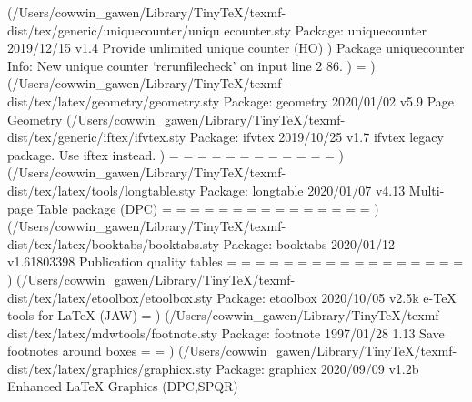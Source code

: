 (/Users/cowwin_gawen/Library/TinyTeX/texmf-dist/tex/generic/uniquecounter/uniqu
ecounter.sty
Package: uniquecounter 2019/12/15 v1.4 Provide unlimited unique counter (HO)
)
Package uniquecounter Info: New unique counter `rerunfilecheck' on input line 2
86.
)
\Hy@SectionHShift=
)
(/Users/cowwin_gawen/Library/TinyTeX/texmf-dist/tex/latex/geometry/geometry.sty
Package: geometry 2020/01/02 v5.9 Page Geometry
(/Users/cowwin_gawen/Library/TinyTeX/texmf-dist/tex/generic/iftex/ifvtex.sty
Package: ifvtex 2019/10/25 v1.7 ifvtex legacy package. Use iftex instead.
)
\Gm@cnth=
\Gm@cntv=
\c@Gm@tempcnt=
\Gm@bindingoffset=
\Gm@wd@mp=
\Gm@odd@mp=
\Gm@even@mp=
\Gm@layoutwidth=
\Gm@layoutheight=
\Gm@layouthoffset=
\Gm@layoutvoffset=
\Gm@dimlist=
) (/Users/cowwin_gawen/Library/TinyTeX/texmf-dist/tex/latex/tools/longtable.sty
Package: longtable 2020/01/07 v4.13 Multi-page Table package (DPC)
\LTleft=
\LTright=
\LTpre=
\LTpost=
\LTchunksize=
\LTcapwidth=
\LT@head=
\LT@firsthead=
\LT@foot=
\LT@lastfoot=
\LT@cols=
\LT@rows=
\c@LT@tables=
\c@LT@chunks=
\LT@p@ftn=
)
(/Users/cowwin_gawen/Library/TinyTeX/texmf-dist/tex/latex/booktabs/booktabs.sty
Package: booktabs 2020/01/12 v1.61803398 Publication quality tables
\heavyrulewidth=
\lightrulewidth=
\cmidrulewidth=
\belowrulesep=
\belowbottomsep=
\aboverulesep=
\abovetopsep=
\cmidrulesep=
\cmidrulekern=
=
\@cmidla=
\@cmidlb=
\@aboverulesep=
\@belowrulesep=
\@thisruleclass=
\@lastruleclass=
\@thisrulewidth=
)
(/Users/cowwin_gawen/Library/TinyTeX/texmf-dist/tex/latex/etoolbox/etoolbox.sty
Package: etoolbox 2020/10/05 v2.5k e-TeX tools for LaTeX (JAW)
\etb@tempcnta=
)
(/Users/cowwin_gawen/Library/TinyTeX/texmf-dist/tex/latex/mdwtools/footnote.sty
Package: footnote 1997/01/28 1.13 Save footnotes around boxes
\fn@notes=
\fn@width=
)
(/Users/cowwin_gawen/Library/TinyTeX/texmf-dist/tex/latex/graphics/graphicx.sty
Package: graphicx 2020/09/09 v1.2b Enhanced LaTeX Graphics (DPC,SPQR)

